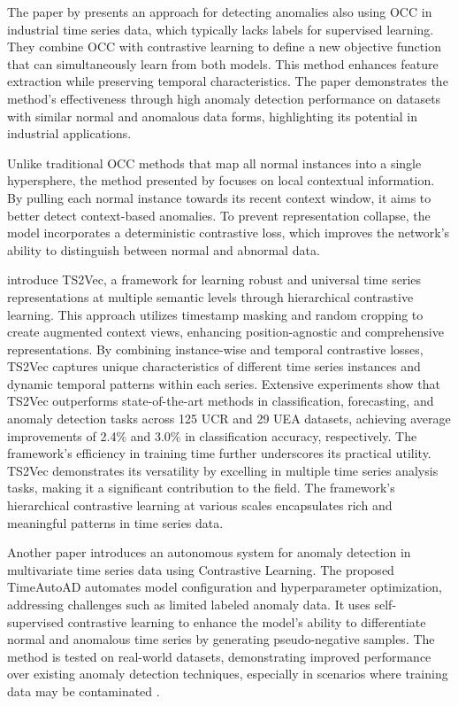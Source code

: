%
The paper by  presents an approach for detecting anomalies also using OCC in industrial time series data, which typically lacks labels for supervised learning. They combine OCC with contrastive learning to define a new objective function that can simultaneously learn from both models. This method enhances feature extraction while preserving temporal characteristics. The paper demonstrates the method's effectiveness through high anomaly detection performance on datasets with similar normal and anomalous data forms, highlighting its potential in industrial applications.

Unlike traditional OCC methods that map all normal instances into a single hypersphere, the method presented by  focuses on local contextual information. By pulling each normal instance towards its recent context window, it aims to better detect context-based anomalies. To prevent representation collapse, the model incorporates a deterministic contrastive loss, which improves the network's ability to distinguish between normal and abnormal data.

 introduce TS2Vec, a framework for learning robust and universal time series representations at multiple semantic levels through hierarchical contrastive learning. This approach utilizes timestamp masking and random cropping to create augmented context views, enhancing position-agnostic and comprehensive representations. By combining instance-wise and temporal contrastive losses, TS2Vec captures unique characteristics of different time series instances and dynamic temporal patterns within each series. Extensive experiments show that TS2Vec outperforms state-of-the-art methods in classification, forecasting, and anomaly detection tasks across 125 UCR and 29 UEA datasets, achieving average improvements of 2.4\% and 3.0\% in classification accuracy, respectively. The framework's efficiency in training time further underscores its practical utility. TS2Vec demonstrates its versatility by excelling in multiple time series analysis tasks, making it a significant contribution to the field. The framework's hierarchical contrastive learning at various scales encapsulates rich and meaningful patterns in time series data.

Another paper introduces an autonomous system for anomaly detection in multivariate time series data using Contrastive Learning. The proposed TimeAutoAD automates model configuration and hyperparameter optimization, addressing challenges such as limited labeled anomaly data. It uses self-supervised contrastive learning to enhance the model's ability to differentiate normal and anomalous time series by generating pseudo-negative samples. The method is tested on real-world datasets, demonstrating improved performance over existing anomaly detection techniques, especially in scenarios where training data may be contaminated .

